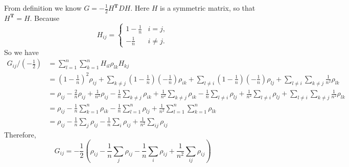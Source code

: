 \documentclass[twoside,11pt]{homework}
\begin{document}
From definition we know $G = -\frac{1}{2}H^\mathbf{T}DH$. Here $H$ is a symmetric matrix, so that $H^\mathbf{T}=H$. Because 
\[H_{ij}=\begin{cases}

1-\frac{1}{n}&\text{$i = j$},\\

-\frac{1}{n}&

\text{$i \neq j$}.

\end{cases}\]
So we have
\begin{align*}
    G_{ij} / (-\frac{1}{2})&= \sum_{l=1}^n \sum_{k=1}^n H_{il}\rho_{lk}H_{kj}\\
    &=(1-\frac{1}{n})^2 \rho_{ij} + 
    \sum_{k \neq j}(1-\frac{1}{n})(-\frac{1}{n})\rho_{ik} +
    \sum_{l\neq i}(1-\frac{1}{n})(-\frac{1}{n})\rho_{lj} +
    \sum_{l \neq i}\sum_{k\neq j}\frac{1}{n^2}\rho_{lk}\\
    &=\rho_{ij} - \frac{2}{n}\rho_{ij} + \frac{1}{n^2}\rho_{ij} - \frac{1}{n} \sum_{k \neq j}\rho_{ik} + \frac{1}{n^2}\sum_{k \neq j}\rho_{ik} -
    \frac{1}{n} \sum_{l\neq i}\rho_{lj} + \frac{1}{n^2}\sum_{l\neq i}\rho_{lj} + 
    \sum_{l \neq i}\sum_{k\neq j}\frac{1}{n^2}\rho_{lk}\\
    &= \rho_{ij} - \frac{1}{n}\sum_{k=1}^n \rho_{ik} - \frac{1}{n}\sum_{l=1}^n \rho_{lj} + \frac{1}{n^2}\sum_{l=1}^n\sum_{k=1}^n\rho_{lk}\\
    &= \rho_{ij} - \frac{1}{n}\sum_{j}\rho_{ij} - \frac{1}{n}\sum_{i}\rho_{ij} + \frac{1}{n^2}\sum_{ij}\rho_{ij}
\end{align*}
Therefore, $$G_{ij} = -\frac{1}{2}(\rho_{ij} - \frac{1}{n}\sum_{j}\rho_{ij} - \frac{1}{n}\sum_{i}\rho_{ij} + \frac{1}{n^2}\sum_{ij}\rho_{ij})$$
\end{document}
